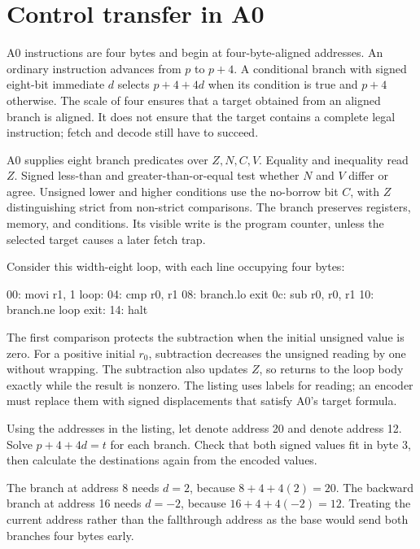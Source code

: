 \section{Control transfer in A0}

A0 instructions are four bytes and begin at four-byte-aligned addresses. An
ordinary instruction advances from \(p\) to \(p+4\). A conditional branch with
signed eight-bit immediate \(d\) selects \(p+4+4d\) when its condition is true
and \(p+4\) otherwise. The scale of four ensures that a target obtained from
an aligned branch is aligned. It does not ensure that the target contains a
complete legal instruction; fetch and decode still have to succeed.

A0 supplies eight branch predicates over \(Z,N,C,V\). Equality and inequality
read \(Z\). Signed less-than and greater-than-or-equal test whether \(N\) and
\(V\) differ or agree. Unsigned lower and higher conditions use the no-borrow
bit \(C\), with \(Z\) distinguishing strict from non-strict comparisons. The
branch preserves registers, memory, and conditions. Its visible write is the
program counter, unless the selected target causes a later fetch trap.

Consider this width-eight loop, with each line occupying four bytes:

\begin{codelisting}[language={},caption={A0 counts r0 down to zero}]
00: movi r1, 1
loop:
04: cmp  r0, r1
08: branch.lo exit
0c: sub  r0, r0, r1
10: branch.ne loop
exit:
14: halt
\end{codelisting}

The first comparison protects the subtraction when the initial unsigned value
is zero. For a positive initial \(r_0\), subtraction decreases the unsigned
reading by one without wrapping. The subtraction also updates \(Z\), so
 returns to the loop body exactly while the result is nonzero.
The listing uses labels for reading; an encoder must replace them with signed
displacements that satisfy A0's target formula.

\begin{tryit}[title={Encode both A0 branch displacements}]
Using the addresses in the listing, let  denote address 20 and
 denote address 12. Solve \(p+4+4d=t\) for each branch. Check that
both signed values fit in byte 3, then calculate the destinations again from the
encoded values.
\end{tryit}

The branch at address 8 needs \(d=2\), because \(8+4+4(2)=20\). The backward
branch at address 16 needs \(d=-2\), because \(16+4+4(-2)=12\). Treating the
current address rather than the fallthrough address as the base would send
both branches four bytes early.

